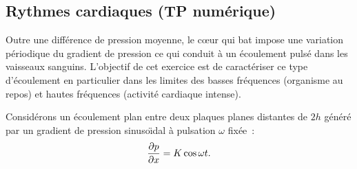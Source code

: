 \subsection{Rythmes cardiaques (TP numérique)}

Outre une diff\'erence de pression moyenne,
le c{\oe}ur qui bat impose une variation p\'eriodique du gradient de
pression ce qui conduit \`a un \'ecoulement puls\'e dans les vaisseaux
sanguins.
L'objectif de cet exercice est de caract\'eriser ce type d'\'ecoulement
en particulier dans les limites des basses fr\'equences (organisme au repos) 
et hautes fr\'equences (activit\'e cardiaque intense).
 
Consid\'erons un \'ecoulement plan entre deux plaques planes distantes de $2h$
g\'en\'er\'e par un gradient de pression sinuso\"{\i}dal
\`a pulsation $\omega$ fix\'ee~:
\[
\frac {\partial p} {\partial x} = K \cos\omega t.
\]

